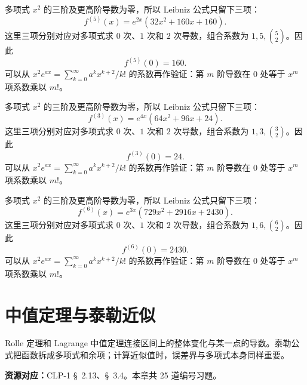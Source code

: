 \documentclass[12pt,fontset=fandol]{ctexart}
\begin{document}
\begin{solve}\label{ans:c9q22}
多项式 $x^2$ 的三阶及更高阶导数为零，所以 Leibniz 公式只留下三项：
\[
f^{(5)}(x)=e^{2x}\left(32x^2+160x+160\right).
\]
这里三项分别对应对多项式求 $0$ 次、$1$ 次和 $2$ 次导数，组合系数为 $1,5,\binom{5}2$。因此
\[
f^{(5)}(0)=160.
\]
可以从 $x^2e^{ax}=\sum_{k=0}^\infty a^kx^{k+2}/k!$ 的系数再作验证：第 $m$ 阶导数在 $0$ 处等于 $x^m$ 项系数乘以 $m!$。
\end{solve}

\begin{solve}\label{ans:c9q23}
多项式 $x^2$ 的三阶及更高阶导数为零，所以 Leibniz 公式只留下三项：
\[
f^{(3)}(x)=e^{4x}\left(64x^2+96x+24\right).
\]
这里三项分别对应对多项式求 $0$ 次、$1$ 次和 $2$ 次导数，组合系数为 $1,3,\binom{3}2$。因此
\[
f^{(3)}(0)=24.
\]
可以从 $x^2e^{ax}=\sum_{k=0}^\infty a^kx^{k+2}/k!$ 的系数再作验证：第 $m$ 阶导数在 $0$ 处等于 $x^m$ 项系数乘以 $m!$。
\end{solve}

\begin{solve}\label{ans:c9q24}
多项式 $x^2$ 的三阶及更高阶导数为零，所以 Leibniz 公式只留下三项：
\[
f^{(6)}(x)=e^{3x}\left(729x^2+2916x+2430\right).
\]
这里三项分别对应对多项式求 $0$ 次、$1$ 次和 $2$ 次导数，组合系数为 $1,6,\binom{6}2$。因此
\[
f^{(6)}(0)=2430.
\]
可以从 $x^2e^{ax}=\sum_{k=0}^\infty a^kx^{k+2}/k!$ 的系数再作验证：第 $m$ 阶导数在 $0$ 处等于 $x^m$ 项系数乘以 $m!$。
\end{solve}

\clearpage
\section{中值定理与泰勒近似}\label{sec:ch10}
Rolle 定理和 Lagrange 中值定理连接区间上的整体变化与某一点的导数。泰勒公式把函数拆成多项式和余项；计算近似值时，误差界与多项式本身同样重要。

\textbf{资源对应：}CLP-1 \S~2.13、\S~3.4。本章共 25 道编号习题。
\end{document}
